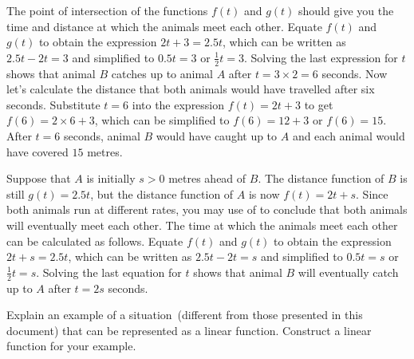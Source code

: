 \documentclass[a4paper,oneside,12pt]{article}
\begin{document}
\begin{problem}
{\begin{solution}
The point of intersection of the functions $f(t)$ and $g(t)$ should
give you the time and distance at which the animals meet each other.
Equate $f(t)$ and $g(t)$ to obtain the expression $2t + 3 = 2.5t$,
which can be written as $2.5t - 2t = 3$ and simplified to
$0.5t = 3$ or $\frac{1}{2}t = 3$.  Solving the last expression for $t$
shows that animal $B$ catches up to animal $A$ after
$t = 3 \times 2 = 6$ seconds.  Now let's calculate the distance that
both animals would have travelled after six seconds.  Substitute
$t = 6$ into the expression $f(t) = 2t + 3$ to get
$f(6) = 2 \times 6 + 3$, which can be simplified to $f(6) = 12 + 3$ or
$f(6) = 15$.  After $t = 6$ seconds, animal $B$ would have caught up
to $A$ and each animal would have covered $15$ metres.

Suppose that $A$ is initially $s > 0$ metres ahead of $B$.  The
distance function of $B$ is still $g(t) = 2.5t$, but the distance
function of $A$ is now $f(t) = 2t + s$.  Since both animals run at
different rates, you may
use 
of  to conclude that
both animals will eventually meet each other.  The time at which the
animals meet each other can be calculated as follows.  Equate $f(t)$
and $g(t)$ to obtain the expression $2t + s = 2.5t$, which can be
written as $2.5t - 2t = s$ and simplified to $0.5t = s$ or
$\frac{1}{2} t = s$.  Solving the last equation for $t$ shows that
animal $B$ will eventually catch up to $A$ after $t = 2s$ seconds.
\end{solution}
}{}

\item Explain an example of a situation~(different from those
  presented in this document) that can be represented as a linear
  function.  Construct a linear function for your example.
\end{problem}
\end{document}
